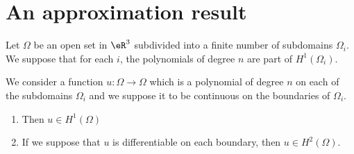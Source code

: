 \section{An approximation result}

\begin{theorem}
    Let \( \Omega\) be an open set in \( \eR^3\) subdivided into a finite number of subdomains \( \Omega_i\). We suppose that for each \( i\), the polynomials of degree \( n\) are part of \( H^1(\Omega_i)\).

    We consider a function \( u\colon \Omega\to \Omega\) which is a polynomial of degree \( n\) on each of the subdomains \( \Omega_i\) and we suppose it to be continuous on the boundaries of \( \Omega_i\).

    \begin{enumerate}
        \item
            Then \( u\in H^1(\Omega)\)
        \item
            If we suppose that \( u\) is differentiable on each boundary, then \( u\in H^2(\Omega)\).
    \end{enumerate}
\end{theorem}

